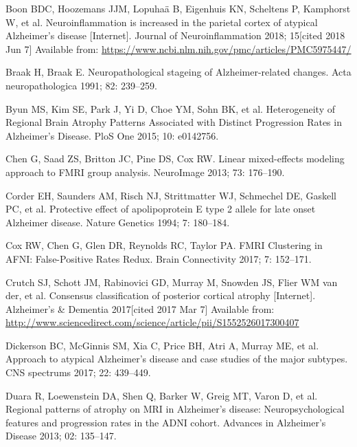\documentclass[]{article}
\begin{document}
\hypertarget{ref-boon_neuroinflammation_2018}{}
Boon BDC, Hoozemans JJM, Lopuhaä B, Eigenhuis KN, Scheltens P, Kamphorst
W, et al. Neuroinflammation is increased in the parietal cortex of
atypical Alzheimer's disease {[}Internet{]}. Journal of
Neuroinflammation 2018; 15{[}cited 2018 Jun 7{]} Available from:
\url{https://www.ncbi.nlm.nih.gov/pmc/articles/PMC5975447/}

\hypertarget{ref-braak_neuropathological_1991}{}
Braak H, Braak E. Neuropathological stageing of Alzheimer-related
changes. Acta neuropathologica 1991; 82: 239--259.

\hypertarget{ref-byun_heterogeneity_2015}{}
Byun MS, Kim SE, Park J, Yi D, Choe YM, Sohn BK, et al. Heterogeneity of
Regional Brain Atrophy Patterns Associated with Distinct Progression
Rates in Alzheimer's Disease. PloS One 2015; 10: e0142756.

\hypertarget{ref-chen_linear_2013}{}
Chen G, Saad ZS, Britton JC, Pine DS, Cox RW. Linear mixed-effects
modeling approach to FMRI group analysis. NeuroImage 2013; 73: 176--190.

\hypertarget{ref-corder_protective_1994}{}
Corder EH, Saunders AM, Risch NJ, Strittmatter WJ, Schmechel DE, Gaskell
PC, et al. Protective effect of apolipoprotein E type 2 allele for late
onset Alzheimer disease. Nature Genetics 1994; 7: 180--184.

\hypertarget{ref-cox_fmri_2017}{}
Cox RW, Chen G, Glen DR, Reynolds RC, Taylor PA. FMRI Clustering in
AFNI: False-Positive Rates Redux. Brain Connectivity 2017; 7: 152--171.

\hypertarget{ref-crutch_consensus_2017}{}
Crutch SJ, Schott JM, Rabinovici GD, Murray M, Snowden JS, Flier WM van
der, et al. Consensus classification of posterior cortical atrophy
{[}Internet{]}. Alzheimer's \& Dementia 2017{[}cited 2017 Mar 7{]}
Available from:
\url{http://www.sciencedirect.com/science/article/pii/S1552526017300407}

\hypertarget{ref-dickerson_approach_2017}{}
Dickerson BC, McGinnis SM, Xia C, Price BH, Atri A, Murray ME, et al.
Approach to atypical Alzheimer's disease and case studies of the major
subtypes. CNS spectrums 2017; 22: 439--449.

\hypertarget{ref-duara_regional_2013}{}
Duara R, Loewenstein DA, Shen Q, Barker W, Greig MT, Varon D, et al.
Regional patterns of atrophy on MRI in Alzheimer's disease:
Neuropsychological features and progression rates in the ADNI cohort.
Advances in Alzheimer's Disease 2013; 02: 135--147.
\end{document}
